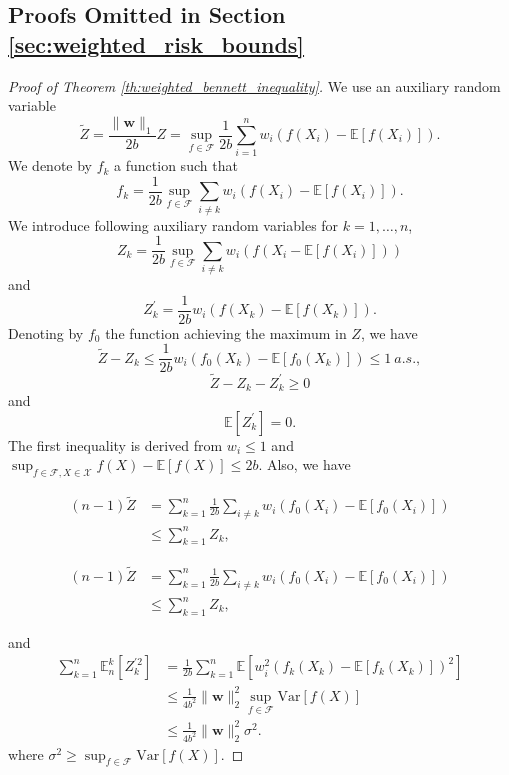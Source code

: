 \documentclass[letterpaper]{article} %
\def\DoubleColumn{}
\def\DoubleColumnEnd{}
\def\SingleColumn{}
\def\SingleColumnEnd{}
\newcommand{\E}{\mathbb{E}}
\newcommand{\Var}{\text{Var}}
\newcommand{\weight}{\mathbf{w}}
\newcommand{\normo}[1]{\|#1\|_1}
\begin{document}
\subsection{Proofs Omitted in Section \ref{sec:weighted_risk_bounds}} %
\label{sec:proof_omitted_in_section_sec:weighted_risk_bounds}


\begin{proof}[Proof of Theorem \ref{th:weighted_bennett_inequality}] %
    We use an auxiliary random variable
    \[\widetilde{Z}=\frac{\normo{\weight{}}}{2b}Z=\sup_{f\in\mathcal{F}}\frac{1}{2b}\sum_{i=1}^n w_i\allowbreak(f(X_i)-\E[f(X_i)]).\]
    We denote by $f_k$ a function such that
    \[f_k = \frac{1}{2b}\sup_{f\in\mathcal F} \sum_{i\neq k}w_i(f(X_i)-\E[f(X_i)]).\]
    We introduce following auxiliary random variables for $k=1,\dots,n$,
    \[Z_k = \frac{1}{2b}\sup_{f\in\mathcal F} \sum_{i\neq k}w_i(f(X_i-\E[f(X_i)]))\]
    and
    \[Z_k^\prime = \frac{1}{2b}w_i(f(X_k)-\E[f(X_k)]).\]
    Denoting by $f_0$ the function achieving the maximum in $Z$, we have
    \[\widetilde{Z}-Z_k\le \frac{1}{2b}w_i(f_0(X_k)-\E[f_0(X_k)])\le 1\ a.s.,\]
    \[\widetilde{Z}-Z_k-Z_k^\prime\ge 0\]
    and
    \[\E[Z_k^\prime] = 0.\]
    The first inequality is derived from $w_i\le 1$ and $\sup_{f\in\mathcal{F}, X\in\mathcal{X}} f(X)-\E[f(X)]\le 2b$.
    Also, we have
    \DoubleColumn
    \begin{align*}
        (n-1)\widetilde{Z} &= \sum_{k=1}^n\frac{1}{2b}\sum_{i\neq k}w_i(f_0(X_i)-\E[f_0(X_i)])\\
        &\le \sum_{k=1}^n Z_k,
    \end{align*}
    \DoubleColumnEnd
    \SingleColumn
    \begin{align*}
        (n-1)\widetilde{Z} &= \sum_{k=1}^n\frac{1}{2b}\sum_{i\neq k}w_i(f_0(X_i)-\E[f_0(X_i)])\\
        &\le \sum_{k=1}^n Z_k,
    \end{align*}
    \SingleColumnEnd
    and
    \begin{align*}
        \sum_{k=1}^n \E_n^k[Z_k^{\prime2}] &= \frac{1}{2b}\sum_{k=1}^n \E[w_i^2(f_k(X_k)-\E[f_k(X_k)])^2]\\
        &\le \frac{1}{4b^2}\|\weight{}\|_2^2\sup_{f\in\mathcal F}\Var[f(X)]\\
        &\le \frac{1}{4b^2}\|\weight{}\|_2^2\sigma^2.
    \end{align*}
    where $\sigma^2\ge \sup_{f\in\mathcal F}\Var[f(X)]$.

\end{proof}
\end{document}
